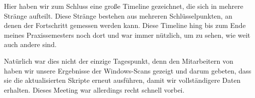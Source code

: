 Hier haben wir zum Schluss eine große Timeline gezeichnet, die sich in mehrere Stränge aufteilt.
Diese Stränge bestehen aus mehreren Schlüsselpunkten, an denen der Fortschritt gemessen werden kann.
Diese Timeline hing bis zum Ende meines Praxissemesters noch dort und war immer nützlich, um zu sehen, wie weit auch andere sind.

Natürlich war dies nicht der einzige Tagespunkt, denn den Mitarbeitern von {\aeclientZEZESE} haben wir unsere Ergebnisse der Windows-Scans gezeigt und darum gebeten, dass sie die aktualisierten Skripte erneut ausführen, damit wir vollständigere Daten erhalten.
Dieses Meeting war allerdings recht schnell vorbei.
